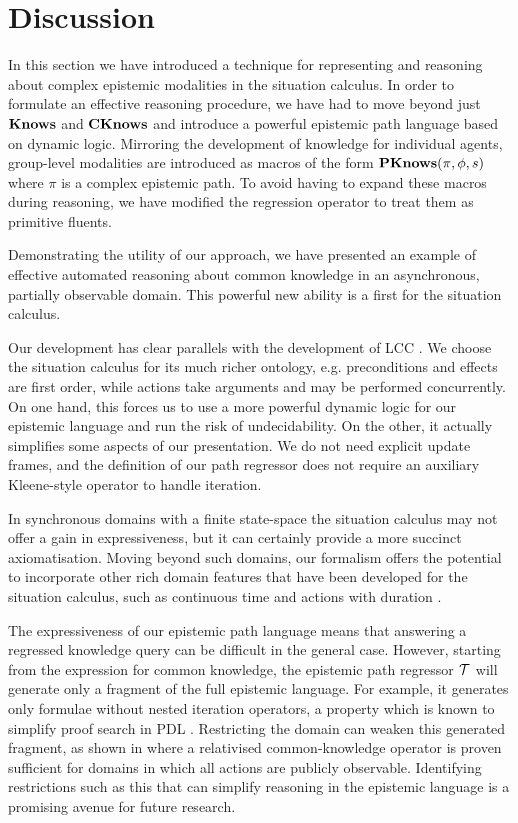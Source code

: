 \section{Discussion\label{sub:CEM-Discussion}}

In this section we have introduced a technique for representing and
reasoning about complex epistemic modalities in the situation calculus.
In order to formulate an effective reasoning procedure, we have had
to move beyond just $\mathbf{Knows}$ and $\mathbf{CKnows}$ and introduce a powerful
epistemic path language based on dynamic logic. Mirroring the development
of knowledge for individual agents, group-level modalities are introduced
as macros of the form $\mathbf{PKnows}(\pi,\phi,s)$ where $\pi$ is a complex
epistemic path. To avoid having to expand these macros during reasoning,
we have modified the regression operator to treat them as primitive
fluents.

Demonstrating the utility of our approach, we have presented an example
of effective automated reasoning about common knowledge in an asynchronous,
partially observable domain. This powerful new ability is a first
for the situation calculus.

Our development has clear parallels with the development of LCC \citep{vanBenthem06lcc}.
We choose the situation calculus for its much richer ontology, e.g.
preconditions and effects are first order, while actions take arguments
and may be performed concurrently. On one hand, this forces us to
use a more powerful dynamic logic for our epistemic language and run
the risk of undecidability. On the other, it actually simplifies some
aspects of our presentation. We do not need explicit update frames,
and the definition of our path regressor does not require an auxiliary
Kleene-style operator to handle iteration.

In synchronous domains with a finite state-space the situation calculus
may not offer a gain in expressiveness, but it can certainly provide
a more succinct axiomatisation. Moving beyond such domains, our formalism
offers the potential to incorporate other rich domain features that
have been developed for the situation calculus, such as continuous
time and actions with duration \citep{reiter96sc_nat_conc}.

The expressiveness of our epistemic path language means that answering
a regressed knowledge query can be difficult in the general case.
However, starting from the expression for common knowledge, the epistemic
path regressor $\mathcal{T}$ will generate only a fragment of the full epistemic
language. For example, it generates only formulae without nested iteration
operators, a property which is known to simplify proof search in PDL
\citep{abate07twb_pdl}. Restricting the domain can weaken this generated
fragment, as shown in \citep{vanBenthem06lcc} where a relativised
common-knowledge operator is proven sufficient for domains in which
all actions are publicly observable. Identifying restrictions such
as this that can simplify reasoning in the epistemic language is a
promising avenue for future research.

